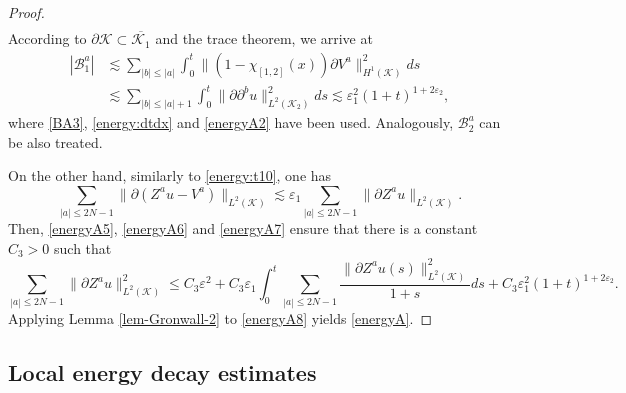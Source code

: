 \documentclass[11pt,twoside]{article}
\def\cB{\mathcal B}
\def\cK{\mathcal K}
\def\p{\partial}
\def\ve{\varepsilon}
\def\ls{\lesssim}
\theoremstyle{plain}
\theoremstyle{definition}
\numberwithin{equation}{section}
\begin{document}
\begin{proof}
\begin{equation}
\begin{split}
\end{split}
\end{equation}
According to $\p\cK\subset\overline{\cK_1}$ and the trace theorem, we arrive at
\begin{equation}\label{energyA6}
\begin{split}
|\cB^a_1|&\ls\sum_{|b|\le|a|}\int_0^t\|(1-\chi_{[1,2]}(x))\p V^a\|^2_{H^1(\cK)}ds\\
&\ls\sum_{|b|\le|a|+1}\int_0^t\|\p \p^bu\|^2_{L^2(\cK_2)}ds\ls\ve_1^2(1+t)^{1+2\ve_2},
\end{split}
\end{equation}
where \eqref{BA3}, \eqref{energy:dtdx} and \eqref{energyA2} have been used.
Analogously, $\cB^a_2$ can be also treated.

On the other hand, similarly to \eqref{energy:t10}, one has
\begin{equation}\label{energyA7}
\sum_{|a|\le2N-1}\|\p(Z^au-V^a)\|_{L^2(\cK)}\ls\ve_1\sum_{|a|\le2N-1}\|\p Z^au\|_{L^2(\cK)}.
\end{equation}
Then, \eqref{energyA5}, \eqref{energyA6} and \eqref{energyA7} ensure that there is a constant $C_3>0$ such that
\begin{equation}\label{energyA8}
\sum_{|a|\le2N-1}\|\p Z^au\|^2_{L^2(\cK)}\le C_3\ve^2+C_3\ve_1\int_0^t\sum_{|a|\le2N-1}\frac{\|\p Z^au(s)\|^2_{L^2(\cK)}}{1+s}ds
+C_3\ve_1^2(1+t)^{1+2\ve_2}.
\end{equation}
Applying Lemma \ref{lem-Gronwall-2} to \eqref{energyA8} yields \eqref{energyA}.
\end{proof}


\subsection{Local energy decay estimates}
\end{document}
